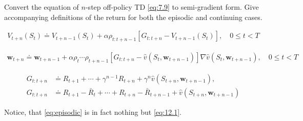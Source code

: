 
\begin{exercise}[Exercise 11.1]

Convert the equation of $n$-step off-policy TD \eqref{eq:7.9} to semi-gradient form.
Give accompanying definitions of the return for both the episodic and continuing cases.

\end{exercise}


\begin{solution}

\begin{align} \label{eq:7.9} \tag{7.9}
    V_{t+n}(S_t)
    \doteq
    V_{t+n-1}(S_t)
    +
    \alpha \rho_{t:t+n-1} [G_{t:t+n} - V_{t+n-1}(S_t)],
    \quad
    0 \leq t < T
\end{align}

\begin{align*}
    \mathbf w_{t+n}
    \doteq
    \mathbf w_{t+n-1}
    +
    \alpha \rho_t \cdots \rho_{t+n-1} [G_{t:t+n} - \hat v(S_t, \mathbf w_{t+n-1})] \nabla \hat v(S_t, \mathbf w_{t+n-1}),
    \quad
    0 \leq t < T
\end{align*}

\begin{align}
    G_{t:t+n}
    & \doteq
    R_{t+1} + \cdots + \gamma^{n-1} R_{t+n} + \gamma^n \hat v(S_{t+n}, \mathbf w_{t+n-1}),
    \label{eq:episodic}
    \tag{episodic} \\
    G_{t:t+n}
    & \doteq
    R_{t+1} - \bar R_t + \cdots + R_{t+n} - \bar R_{t+n-1} + \hat v(S_{t+n}, \mathbf w_{t+n-1})
    \label{eq:continuing}
    \tag{continuing}
\end{align}

Notice, that \eqref{eq:episodic} is in fact nothing but \eqref{eq:12.1}.

\end{solution}

